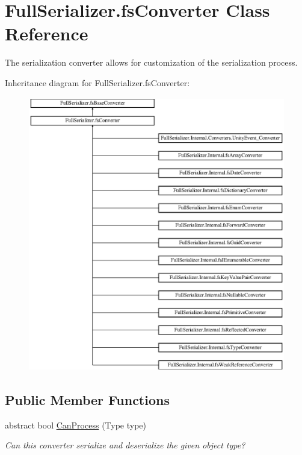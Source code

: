 \hypertarget{class_full_serializer_1_1fs_converter}{}\section{Full\+Serializer.\+fs\+Converter Class Reference}
\label{class_full_serializer_1_1fs_converter}


The serialization converter allows for customization of the serialization process.  


Inheritance diagram for Full\+Serializer.\+fs\+Converter\+:\begin{figure}[H]
\begin{center}
\leavevmode
\includegraphics[height=12.000000cm]{class_full_serializer_1_1fs_converter}
\end{center}
\end{figure}
\subsection*{Public Member Functions}
\begin{DoxyCompactItemize}
\item 
abstract bool \hyperlink{class_full_serializer_1_1fs_converter_a6d9e084c5e7f646a8d220705efaecb35}{Can\+Process} (Type type)
\begin{DoxyCompactList}\small\item\em Can this converter serialize and deserialize the given object type? \end{DoxyCompactList}\end{DoxyCompactItemize}
